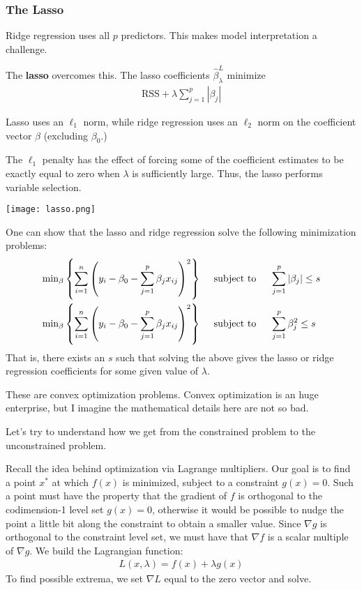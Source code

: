 \documentclass[10pt]{article}
\newcommand{\grad}{\nabla}
\begin{document}
\subsubsection{The Lasso} 
\begin{enumerate}
	\item Ridge regression uses all $p$ predictors.  This makes model interpretation a challenge.
	\item The \textbf{lasso} overcomes this.  The lasso coefficients $\hat \beta_\lambda^L$ minimize 
	\begin{align*}
		\mathrm{RSS} + \lambda \sum_{j = 1}^p |\beta_j| 
	\end{align*}
	\item Lasso uses an $\ell_1$ norm, while ridge regression uses an $\ell_2$ norm on the coefficient vector $\beta$ (excluding $\beta_0$.)
	\item The $\ell_1$ penalty has the effect of forcing some of the coefficient estimates to be exactly equal to zero when $\lambda$ is sufficiently large.  Thus, the lasso performs variable selection.
	
	\texttt{[image: lasso.png]}
	\item One can show that the lasso and ridge regression solve the following minimization problems: 
	\begin{align*}
		\mathrm{min}_\beta \left\{ \sum_{i = 1}^n \left( y_i - \beta_0 - \sum_{j = 1}^p \beta_j x_{ij} \right)^2 \right\} \hspace{.2in} &\text{subject to} \hspace{.2in} \sum_{j = 1}^p |\beta_j| \leq s \\
		\mathrm{min}_\beta \left\{ \sum_{i = 1}^n \left( y_i - \beta_0 - \sum_{j = 1}^p \beta_j x_{ij} \right)^2 \right\} \hspace{.2in} &\text{subject to} \hspace{.2in} \sum_{j = 1}^p \beta_j^2 \leq s 
	\end{align*}
	That is, there exists an $s$ such that solving the above gives the lasso or ridge regression coefficients for some given value of $\lambda$.  {\color{brown} These are convex optimization problems.  Convex optimization is an huge enterprise, but I imagine the mathematical details here are not so bad.
	\item Let's try to understand how we get from the constrained problem to the unconstrained problem.  
	
	Recall the idea behind optimization via Lagrange multipliers.  Our goal is to find a point $x^*$ at which $f(x)$ is minimized, subject to a constraint $g(x) = 0$. Such a point must have the property that the gradient of $f$ is orthogonal to the codimension-1 level set $g(x) = 0$, otherwise it would be possible to nudge the point a little bit along the constraint to obtain a smaller value.  Since $\grad g$ is orthogonal to the constraint level set, we must have that $\grad f$ is a scalar multiple of $\grad g$.  
	We build the Lagrangian function: 
	\begin{align*}
		L(x, \lambda) = f(x) + \lambda g(x)
	\end{align*}
	To find possible extrema, we set $\grad L$ equal to the zero vector and solve.  

}
\end{enumerate}
\end{document}

